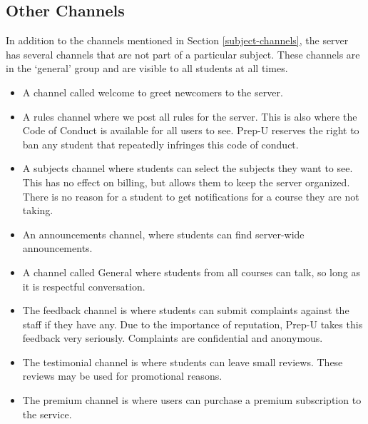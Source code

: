 \documentclass{business}
\begin{document}
    \subsection{Other Channels}
    In addition to the channels mentioned in Section \ref{subject-channels}, the server has several channels that are not part of a particular subject. These channels are in the `general' group and are visible to all students at all times.
    \begin{itemize}
        \item A channel called welcome to greet newcomers to the server.
        \item A rules channel where we post all rules for the server. This is also where the Code of Conduct is available for all users to see. Prep-U reserves the right to ban any student that repeatedly infringes this code of conduct.
        \item A subjects channel where students can select the subjects they want to see. This has no effect on billing, but allows them to keep the server organized. There is no reason for a student to get notifications for a course they are not taking.
        \item An announcements channel, where students can find server-wide announcements.
        \item A channel called General where students from all courses can talk, so long as it is respectful conversation.
        \item The feedback channel is where students can submit complaints against the staff if they have any. Due to the importance of reputation, Prep-U takes this feedback very seriously. Complaints are confidential and anonymous.
        \item The testimonial channel is where students can leave small reviews. These reviews may be used for promotional reasons.
        \item The premium channel is where users can purchase a premium subscription to the service.
    \end{itemize}
\end{document}

